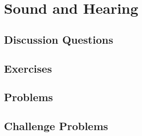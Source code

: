 
\chapter{Sound and Hearing}

\section{Discussion Questions}

\section{Exercises}

\section{Problems}

\section{Challenge Problems}
